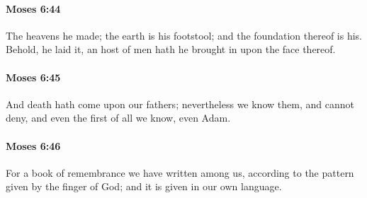 		\paragraph{Moses 6:44} %
			\label{MOSES-6-44}

			The heavens he made; the earth is his footstool; and the foundation thereof is his. Behold, he laid it, an host of men hath he brought in upon the face thereof.


		\paragraph{Moses 6:45} %
			\label{MOSES-6-45}

			And death hath come upon our fathers; nevertheless we know them, and cannot deny, and even the first of all we know, even Adam.


		\paragraph{Moses 6:46} %
			\label{MOSES-6-46}

			For a book of remembrance we have written among us, according to the pattern given by the finger of God; and it is given in our own language.


